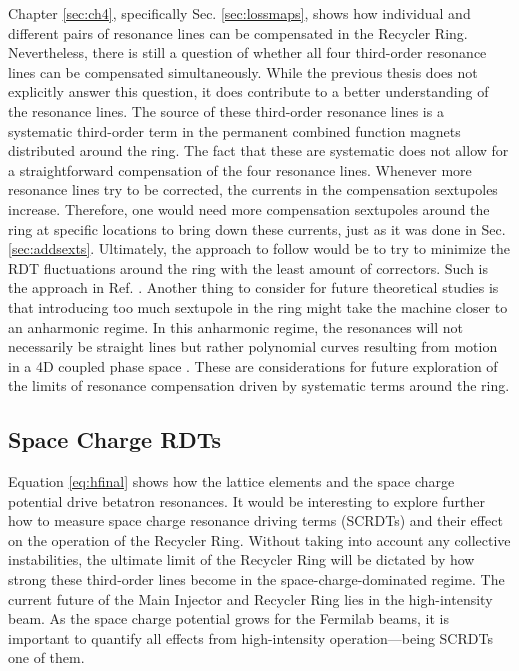 Chapter \ref{sec:ch4}, specifically Sec. \ref{sec:lossmaps}, shows how individual and different pairs of resonance lines can be compensated in the Recycler Ring. Nevertheless, there is still a question of whether all four third-order resonance lines can be compensated simultaneously. While the previous thesis does not explicitly answer this question, it does contribute to a better understanding of the resonance lines. The source of these third-order resonance lines is a systematic third-order term in the permanent combined function magnets distributed around the ring. The fact that these are systematic does not allow for a straightforward compensation of the four resonance lines. Whenever more resonance lines try to be corrected, the currents in the compensation sextupoles increase. Therefore, one would need more compensation sextupoles around the ring at specific locations to bring down these currents, just as it was done in Sec. \ref{sec:addsexts}. Ultimately, the approach to follow would be to try to minimize the RDT fluctuations around the ring with the least amount of correctors. Such is the approach in Ref. \cite{rdtfluct}. Another thing to consider for future theoretical studies is that introducing too much sextupole in the ring might take the machine closer to an anharmonic regime. In this anharmonic regime, the resonances will not necessarily be straight lines but rather polynomial curves resulting from motion in a 4D coupled phase space \cite{fixedlines1,fixedlines2}.  These are considerations for future exploration of the limits of resonance compensation driven by systematic terms around the ring.  

\subsection{Space Charge RDTs}

Equation \ref{eq:hfinal} shows how the lattice elements and the space charge potential drive betatron resonances. It would be interesting to explore further how to measure space charge resonance driving terms (SCRDTs) and their effect on the operation of the Recycler Ring. Without taking into account any collective instabilities, the ultimate limit of the Recycler Ring will be dictated by how strong these third-order lines become in the space-charge-dominated regime. The current future of the Main Injector and Recycler Ring lies in the high-intensity beam. As the space charge potential grows for the Fermilab beams, it is important to quantify all effects from high-intensity operation---being SCRDTs one of them.
